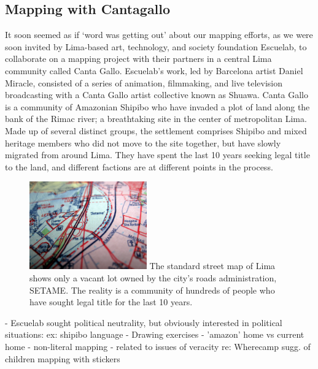 \documentclass[11pt]{report}
\begin{document}
\subsection{Mapping with Cantagallo}

It soon seemed as if `word was getting out' about our mapping efforts, as we were soon invited by Lima-based art, technology, and society foundation Escuelab, to collaborate on a mapping project with their partners in a central Lima community called Canta Gallo. Escuelab's work, led by Barcelona artist Daniel Miracle, consisted of a series of animation, filmmaking, and live television broadcasting with a Canta Gallo artist collective known as Shuawa. Canta Gallo is a community of Amazonian Shipibo who have invaded a plot of land along the bank of the Rimac river; a breathtaking site in the center of metropolitan Lima. Made up of several distinct groups, the settlement comprises Shipibo and mixed heritage members who did not move to the site together, but have slowly migrated from around Lima. They have spent the last 10 years seeking legal title to the land, and different factions are at different points in the process. 

\begin{figure}
	\begin{flushright}
		\includegraphics[width=0.45\textwidth]{images/canta-gallo-setame.jpg}
		The standard street map of Lima shows only a vacant lot owned by the city's roads administration, SETAME. The reality is a community of hundreds of people who have sought legal title for the last 10 years. 
	\end{flushright}
\end{figure}



            - Escuelab sought political neutrality, but obviously interested in political situations: ex: shipibo language
            - Drawing exercises
                - 'amazon' home vs current home
                - non-literal mapping - related to issues of veracity re: Wherecamp sugg. of children mapping with stickers
\end{document}
